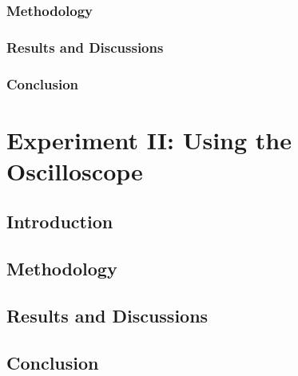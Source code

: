 \documentclass{article}
\begin{document}
\subsubsection{Methodology}

\subsubsection{Results and Discussions}

\subsubsection{Conclusion}


\section{Experiment II: Using the Oscilloscope}

\subsection{Introduction}

\subsection{Methodology}

\subsection{Results and Discussions}

\subsection{Conclusion}
\end{document}
